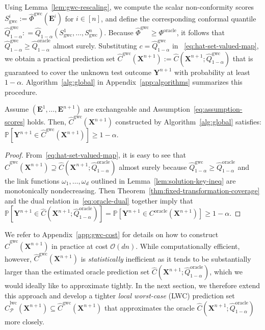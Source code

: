 Using Lemma~\ref{lem:gwc-rescaling}, we compute the scalar non-conformity scores $S^i_{\mathrm{gwc}} := \hat{\Phi}^{\mathrm{gwc}}(\mathbf{E}^i)$ for $i \in [n]$, and define the corresponding conformal quantile  $\hat{Q}^{\mathrm{gwc}}_{1-\alpha}: = \hat{Q}_{1-\alpha}(S^1_{\mathrm{gwc}},\ldots, S^n_{\mathrm{gwc}})$.
Because $\hat{\Phi}^{\mathrm{gwc}}\geq \Phi^\mathrm{oracle}$, it follows that 
$\hat{Q}^{\mathrm{gwc}}_{1-\alpha} \geq \hat{Q}^{\mathrm{oracle}}_{1-\alpha}$ almost surely. Substituting $c=\hat{Q}^{\mathrm{gwc}}_{1-\alpha}$ in ~\eqref{eq:hat-set-valued-map}, we obtain a practical prediction set $\hat{C}^{\mathrm{gwc}}(\mathbf{X}^{n+1}):= \hat{C}(\mathbf{X}^{n+1}; \hat{Q}^{\mathrm{gwc}}_{1-\alpha})$ that is guaranteed to cover the unknown test outcome $\mathbf{Y}^{n+1}$ with probability at least $1-\alpha$.
Algorithm~\ref{alg:global} in Appendix~\ref{app:algorithms} summarizes this procedure.
\begin{theorem} \label{thm:TSCP-GWC-coverage}
Assume $(\mathbf{E}^1,\ldots,\mathbf{E}^{n+1})$ are exchangeable and Assumption~\ref{eq:assumption-scores} holds.
Then, $\hat{C}^{\mathrm{gwc}}(\mathbf{X}^{n+1})$ constructed by Algorithm~\ref{alg:global} satisfies: $\mathbb{P}[ \mathbf{Y}^{n+1} \in \hat{C}^{\mathrm{gwc}}(\mathbf{X}^{n+1}) ] \ge 1 - \alpha$.
\end{theorem}

\begin{proof}
From~\eqref{eq:hat-set-valued-map}, it is easy to see that $\hat{C}^{\mathrm{gwc}}(\mathbf{X}^{n+1}) \supseteq \hat{C}(\mathbf{X}^{n+1}; \hat{Q}^{\mathrm{oracle}}_{1-\alpha})$ almost surely because $\hat{Q}^{\mathrm{gwc}}_{1-\alpha} \geq \hat{Q}^{\mathrm{oracle}}_{1-\alpha}$ and the link functions $\omega_1,\ldots,\omega_d$ outlined in Lemma~\ref{lem:solution-key-ineq} are monotonically nondecreasing. Then Theorem~\ref{thm:fixed-transformation-coverage} and the dual relation in~\eqref{eq:oracle-dual} together imply that $\mathbb{P}[ \mathbf{Y}^{n+1} \in \hat{C}(\mathbf{X}^{n+1}; \hat{Q}^{\mathrm{oracle}}_{1-\alpha}) ]=\mathbb{P}[ \mathbf{Y}^{n+1} \in {C}^\mathrm{oracle}(\mathbf{X}^{n+1}) ] \ge 1 - \alpha$.
\end{proof}

We refer to Appendix~\ref{app:gwc-cost} for details on how to construct $\hat{C}^{\mathrm{gwc}}(\mathbf{X}^{n+1})$ in practice at cost $\mathcal{O}(dn)$. While computationally efficient, however, $\hat{C}^{\mathrm{gwc}}(\mathbf{X}^{n+1})$ is {\em statistically} inefficient as it tends to be substantially larger than the estimated oracle prediction set $\hat{C}(\mathbf{X}^{n+1}; \hat{Q}^{\mathrm{oracle}}_{1-\alpha})$, which we would ideally like to approximate tightly.
In the next section, we therefore extend this approach and develop a tighter {\em local worst-case} (LWC) prediction set $\hat{C}^{\mathrm{lwc}}_{\mathcal{P}}(\mathbf{X}^{n+1}) \subseteq \hat{C}^\mathrm{gwc}(\mathbf{X}^{n+1})$ that approximates the oracle $\hat{C}(\mathbf{X}^{n+1}; \hat{Q}^{\mathrm{oracle}}_{1-\alpha})$ more closely. 

